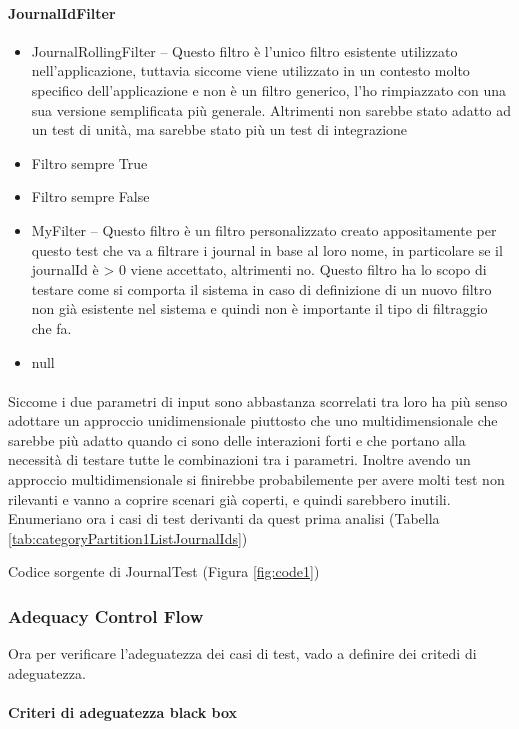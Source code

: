 \documentclass[12pt, a4paper]{article}
\begin{document}
\paragraph{JournalIdFilter}
\begin{itemize}
    \item JournalRollingFilter  -- Questo filtro è l'unico filtro esistente utilizzato nell'applicazione, 
    tuttavia siccome viene utilizzato in un contesto molto specifico dell'applicazione e non è un filtro generico, l'ho rimpiazzato
    con una sua versione semplificata più generale. Altrimenti non sarebbe stato adatto ad un test di unità, ma sarebbe stato 
    più un test di integrazione
    \item Filtro sempre True
    \item Filtro sempre False
    \item MyFilter -- Questo filtro è un filtro personalizzato creato appositamente per questo test che va a filtrare i journal
    in base al loro nome, in particolare se il journalId è > 0 viene accettato, altrimenti no. 
    Questo filtro ha lo scopo di testare come si comporta il sistema in caso di definizione di un nuovo filtro non già esistente 
    nel sistema e quindi non è importante il tipo di filtraggio che fa.
    \item null
\end{itemize}

\paragraph{}

Siccome i due parametri di input sono abbastanza scorrelati tra loro ha più senso adottare un approccio 
unidimensionale piuttosto che uno multidimensionale che sarebbe più adatto quando ci sono delle interazioni forti
e che portano alla necessità di testare tutte le combinazioni tra i parametri. Inoltre avendo un approccio multidimensionale
si finirebbe probabilemente per avere molti test non rilevanti e vanno a coprire scenari già coperti, e quindi sarebbero inutili.
\\ Enumeriano ora i casi di test derivanti da quest prima analisi (Tabella \ref{tab:categoryPartition1ListJournalIds})

Codice sorgente di JournalTest (Figura \ref{fig:code1})

\subsubsection{Adequacy Control Flow}
Ora per verificare l'adeguatezza dei casi di test, vado a definire dei critedi di adeguatezza. \\ \\
\textbf{Criteri di adeguatezza black box}
\end{document}

